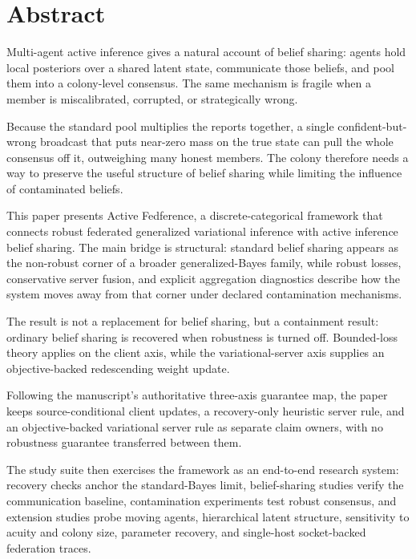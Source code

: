 \documentclass[
  english,
]{article}
\theoremstyle{plain}
\theoremstyle{definition}
\theoremstyle{remark}
\theoremstyle{definition}
\begin{document}
\section{Abstract}\label{sec:abstract}

Multi-agent active inference gives a natural account of belief sharing:
agents hold local posteriors over a shared latent state, communicate
those beliefs, and pool them into a colony-level consensus. The same
mechanism is fragile when a member is miscalibrated, corrupted, or
strategically wrong.

Because the standard pool multiplies the reports together, a single
confident-but-wrong broadcast that puts near-zero mass on the true state
can pull the whole consensus off it, outweighing many honest members.
The colony therefore needs a way to preserve the useful structure of
belief sharing while limiting the influence of contaminated beliefs.

This paper presents Active Fedference, a discrete-categorical framework
that connects robust federated generalized variational inference with
active inference belief sharing. The main bridge is structural: standard
belief sharing appears as the non-robust corner of a broader
generalized-Bayes family, while robust losses, conservative server
fusion, and explicit aggregation diagnostics describe how the system
moves away from that corner under declared contamination mechanisms.

The result is not a replacement for belief sharing, but a containment
result: ordinary belief sharing is recovered when robustness is turned
off. Bounded-loss theory applies on the client axis, while the
variational-server axis supplies an objective-backed redescending weight
update.

Following the manuscript's authoritative three-axis guarantee map, the
paper keeps source-conditional client updates, a recovery-only heuristic
server rule, and an objective-backed variational server rule as separate
claim owners, with no robustness guarantee transferred between them.

The study suite then exercises the framework as an end-to-end research
system: recovery checks anchor the standard-Bayes limit, belief-sharing
studies verify the communication baseline, contamination experiments
test robust consensus, and extension studies probe moving agents,
hierarchical latent structure, sensitivity to acuity and colony size,
parameter recovery, and single-host socket-backed federation traces.
\end{document}
